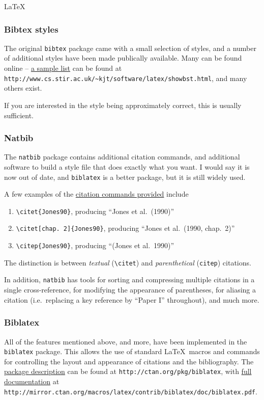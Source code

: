 \begin{chapter}{\LaTeX}
\subsubsection{Bibtex styles}
\label{sec:bibtex_styles}

The original \verb|bibtex| package came with a small selection of styles, and a number of additional styles have been made publically available. Many can be found online -- \href{http://www.cs.stir.ac.uk/~kjt/software/latex/showbst.html}{a sample list} can be found at \verb|http://www.cs.stir.ac.uk/~kjt/software/latex/showbst.html|, and many others exist.

If you are interested in the style being approximately correct, this is usually sufficient.

\subsubsection{Natbib}
\label{sec:natbib_styles}

The \verb|natbib| package contains additional citation commands, and additional software to build a style file that does exactly what you want. I would say it is now out of date, and \verb|biblatex| is a better package, but it is still widely used.

A few examples of the \href{http://merkel.zoneo.net/Latex/natbib.php}{citation commands provided} include
%
\begin{enumerate}
\item \verb|\citet{Jones90}|, producing ``Jones et al.\ (1990)''
\item \verb|\citet[chap. 2]{Jones90}|, producing ``Jones et al.\ (1990, chap.\ 2)''
\item \verb|\citep{Jones90}|, producing ``(Jones et al.\ 1990)''
\end{enumerate}
%
The distinction is between \emph{textual} (\verb|\citet|) and \emph{parenthetical} (\verb|citep|) citations.

In addition, \verb|natbib| has tools for sorting and compressing multiple citations in a single cross-reference, for modifying the appearance of parentheses, for aliasing a citation (i.e.\ replacing a key reference by ``Paper I'' throughout), and much more.

\subsubsection{Biblatex}
\label{sec:biblatex_styles}

All of the features mentioned above, and more, have been implemented in the \verb|biblatex| package. This allows the use of standard \LaTeX\ macros and commands for controlling the layout and appearance of citations and the bibliography. The \href{http://ctan.org/pkg/biblatex}{package description} can be found at \verb|http://ctan.org/pkg/biblatex|, with \href{http://mirror.ctan.org/macros/latex/contrib/biblatex/doc/biblatex.pdf}{full documentation} at
\verb|http://mirror.ctan.org/macros/latex/contrib/biblatex/doc/biblatex.pdf|.


\end{chapter}
